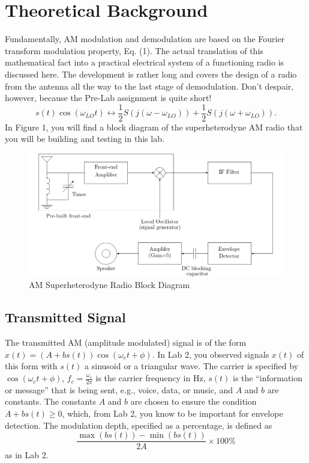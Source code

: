 \documentclass[a4paper]{article}
\begin{document}
\section{Theoretical Background}
Fundamentally, AM modulation and demodulation are based on the Fourier transform modulation property, Eq. (1). The actual translation of this mathematical fact into a practical electrical system of a functioning radio is discussed here. The development is rather long and covers the design of a radio from the antenna all the way to the last stage of demodulation. Don't despair, however, because the Pre-Lab assignment is quite short!
\begin{equation}
	s(t)\cos(\omega_{LO}t)\leftrightarrow\frac{1}{2}S(j(\omega-\omega_{LO}))+\frac{1}{2}S(j(\omega+\omega_{LO})).
\end{equation}
In Figure 1, you will find a block diagram of the superheterodyne AM radio that you will be building and testing in this lab.
\begin{figure}[H]
	\centering
	\includegraphics[width=1\linewidth]{1.png}
	\caption{AM Superheterodyne Radio Block Diagram}
\end{figure}
\subsection{Transmitted Signal}
The transmitted AM (amplitude modulated) signal is of the form $x(t)=(A+bs(t))\cos(\omega_ct+\phi)$. In Lab 2, you observed signals $x(t)$ of this form with $s(t)$ a sinusoid or a triangular wave. The carrier is specified by $\cos(\omega_ct+\phi)$, $f_c=\frac{\omega_c}{2\pi}$ is the carrier frequency in Hz, $s(t)$ is the “information or message” that is being sent, e.g., voice, data, or music, and $A$ and $b$ are constants. The constants $A$ and $b$ are chosen to ensure the condition $A+bs(t)\ge0$, which, from Lab 2, you know to be important for envelope detection. The modulation depth, specified as a percentage, is defined as
\begin{equation}
	\frac{\max(bs(t))-\min(bs(t))}{2A}\times100\%
\end{equation}
as in Lab 2.
\end{document}
